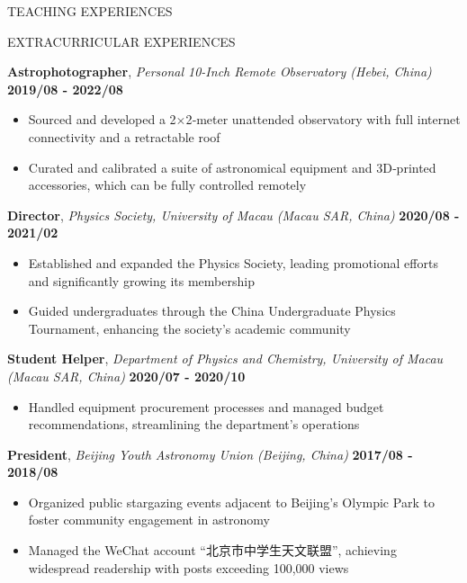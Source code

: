 \documentclass[10pt]{article} %
\begin{document}
\begin{section}{TEACHING EXPERIENCES}
\end{section}

\begin{section}{EXTRACURRICULAR EXPERIENCES}
    
\textbf{Astrophotographer}, \textit{Personal 10-Inch Remote Observatory (Hebei, China)} \hfill \textbf{2019/08 - 2022/08}
\begin{itemize}[leftmargin=1.5em]
    \item Sourced and developed a 2$\times$2‑meter unattended observatory with full internet connectivity and a retractable roof
    \item Curated and calibrated a suite of astronomical equipment and 3D‑printed accessories, which can be fully controlled remotely
\end{itemize}

\textbf{Director}, \textit{Physics Society, University of Macau (Macau SAR, China)} \hfill \textbf{2020/08 - 2021/02} 
\begin{itemize}[leftmargin=1.5em]
    \item Established and expanded the Physics Society, leading promotional efforts and significantly growing its membership
    \item Guided undergraduates through the China Undergraduate Physics Tournament, enhancing the society's academic community
\end{itemize}

\textbf{Student Helper}, \textit{Department of Physics and Chemistry, University of Macau (Macau SAR, China)} \hfill \textbf{2020/07 - 2020/10} 
\begin{itemize}[leftmargin=1.5em]
    \item Handled equipment procurement processes and managed budget recommendations, streamlining the department's operations
\end{itemize}

\textbf{President}, \textit{Beijing Youth Astronomy Union (Beijing, China)} \hfill \textbf{2017/08 - 2018/08} 
\begin{itemize}[leftmargin=1.5em]
    \item Organized public stargazing events adjacent to Beijing’s Olympic Park to foster community engagement in astronomy
    \item Managed the WeChat account ``北京市中学生天文联盟'', achieving widespread readership with posts exceeding 100,000 views
\end{itemize}


\end{section}
\end{document}
